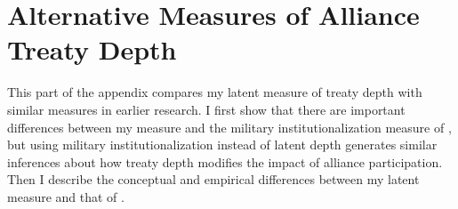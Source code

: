 \documentclass[12pt]{article}
\begin{document}
%
%
%
%
%




\section{Alternative Measures of Alliance Treaty Depth}

This part of the appendix compares my latent measure of treaty depth with similar measures in earlier research.  
I first show that there are important differences between my measure and the military institutionalization measure of \citet{LeedsAnac2005}, but using military institutionalization instead of latent depth generates similar inferences about how treaty depth modifies the impact of alliance participation. 
Then I describe the conceptual and empirical differences between my latent measure and that of \citet{BensonClinton2016}.
\end{document}
